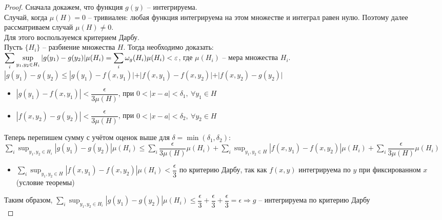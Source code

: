 \begin{proof}
    Сначала докажем, что функция $g(y)$ -- интегрируема. \\
    Случай, когда $\mu(H) = 0$ -- тривиален: любая функция интегрируема на этом множестве 
    и интеграл равен нулю. Поэтому далее рассматриваем случай $\mu(H) \neq 0$. \\  
    Для этого воспользуемся критерием Дарбу.\\
    Пусть $\{H_i\}$ -- разбиение множества $H$. Тогда необходимо доказать: \\
    $\displaystyle \sum_{i} \sup_{y_1, y_2 \in H_i} |g(y_1) - g(y_2)| \mu(H_i) =
    \sum_{i} \omega_{g}(H_i) \mu(H_i) < \varepsilon$, где $\mu(H_i)$ -- мера множества $H_i$. \\ 
    $|g(y_1) - g(y_2) \leqslant |g(y_1) - f(x, y_1)| + |f(x, y_1) - f(x, y_2)| 
    + |f(x, y_2) - g(y_2)|$
    \begin{itemize}
        \item $|g(y_1) - f(x, y_1)| < \dfrac{\epsilon}{3 \mu(H)}$,
        при $ 0 < |x - a| < \delta_1, \ \forall y_1 \in H$
        \item $|f(x, y_2) - g(y_2)| < \dfrac{\epsilon}{3 \mu(H)}$,
        при $ 0 < |x - a| < \delta_2, \ \forall y_2 \in H$
    \end{itemize} 
    Теперь перепишем сумму с учётом оценок выше для $\delta = \min(\delta_1, \delta_2)$: \\
     $\displaystyle \sum_{i} \sup_{y_1, y_2 \in H_i} |g(y_1) - g(y_2)| \mu(H_i) \leqslant
    \sum_i \dfrac{\epsilon}{3 \mu(H)} \mu(H_i) + 
    \sum_i \sup_{y_1, y_2 \in H} |f(x, y_1) - f(x, y_2)| \mu(H_i) +
    \sum_i \dfrac{\epsilon}{3 \mu(H)} \mu(H_i)$ \\
    \begin{itemize}
        \item $\displaystyle \sum_i \sup_{y_1, y_2 \in H} |f(x, y_1) - f(x, y_2)| \mu(H_i) 
        < \dfrac{\epsilon}{3}$ по критерию Дарбу, так как $f(x, y)$ интегрируема по $y$ при
        фиксированном $x$ (условие теоремы)
    \end{itemize} 
    Таким образом, $\displaystyle \sum_{i} \sup_{y_1, y_2 \in H_i} |g(y_1) - g(y_2)| \mu(H_i)
    \leqslant \dfrac{\epsilon}{3} + \dfrac{\epsilon}{3} + \dfrac{\epsilon}{3} = \epsilon
    \Rightarrow g$ -- интегрируема по критерию Дарбу \\
    

\end{proof}
